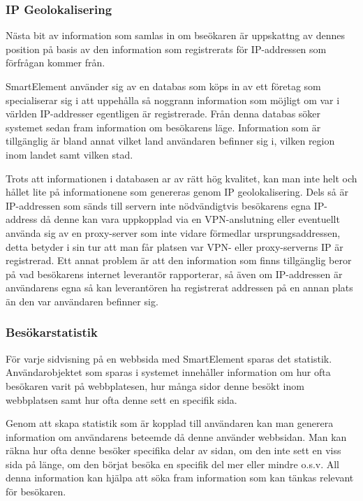 \subsubsection{IP Geolokalisering}

Nästa bit av information som samlas in om bseökaren är uppskattng av dennes position på basis av den information som registrerats för IP-addressen som förfrågan kommer från.

SmartElement använder sig av en databas som köps in av ett företag som specialiserar sig i att uppehålla så noggrann information som möjligt om var i världen IP-addresser egentligen är registrerade. Från denna databas söker systemet sedan fram information om besökarens läge. Information som är tillgänglig är bland annat vilket land användaren befinner sig i, vilken region inom landet samt vilken stad.

Trots att informationen i databasen ar av rätt hög kvalitet, kan man inte helt och hållet lite på informationene som genereras genom IP geolokalisering. Dels så är IP-addressen som sänds till servern inte nödvändigtvis besökarens egna IP-address då denne kan vara uppkopplad via en VPN-anslutning eller eventuellt använda sig av en proxy-server som inte vidare förmedlar ursprungsaddressen, detta betyder i sin tur att man får platsen var VPN- eller proxy-serverns IP är registrerad. Ett annat problem är att den information som finns tillgänglig beror på vad besökarens internet leverantör rapporterar, så även om IP-addressen är användarens egna så kan leverantören ha registrerat addressen på en annan plats än den var användaren befinner sig. 

\subsubsection{Besökarstatistik}

För varje sidvisning på en webbsida med SmartElement sparas det statistik. Användarobjektet som sparas i systemet innehåller information om hur ofta besökaren varit på webbplatesen, hur många sidor denne besökt inom webbplatsen samt hur ofta denne sett en specifik sida.

Genom att skapa statistik som är kopplad till användaren kan man generera information om användarens beteemde då denne använder webbsidan. Man kan räkna hur ofta denne besöker specifika delar av sidan, om den inte sett en viss sida på länge, om den börjat besöka en specifik del mer eller mindre o.s.v. All denna information kan hjälpa att söka fram information som kan tänkas relevant för besökaren.

